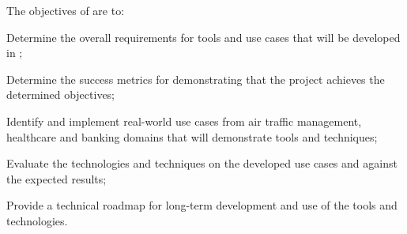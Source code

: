 \addtocounter{wpno}{1}
\begin{Workpackage}{\thewpno}
\WPTitle{\wpname{\thewpno}}



\begin{WPObjectives}
The objectives of \theWP{} are to:
\begin{compactitem}
\item	Determine the overall requirements for tools and use cases that will be developed in \TheProject{};
\item Determine the success metrics for demonstrating that the \TheProject{} project achieves the determined objectives;
\item	Identify and implement real-world use cases from air traffic management, healthcare and banking domains that will demonstrate \TheProject{} tools and techniques;
\item	Evaluate the \TheProject{} technologies and techniques on the developed use cases and against the expected results;
\item	Provide a technical roadmap for long-term development and use of the \TheProject tools and technologies.
\end{compactitem}
\end{WPObjectives}


\end{Workpackage}
